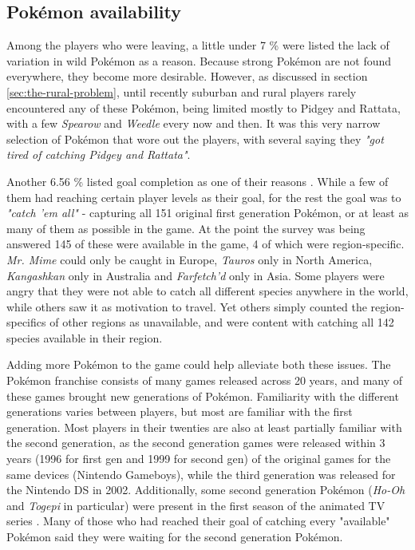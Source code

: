 \subsection{Pokémon availability}
\label{sec:pokemon-availability-and-goal-completion}
Among the players who were leaving, a little under 7 \% were listed the lack of variation in wild Pokémon as a reason. Because strong Pokémon are not found everywhere, they become more desirable. However, as discussed in section \ref{sec:the-rural-problem}, until recently suburban and rural players rarely encountered any of these Pokémon, being limited mostly to Pidgey and Rattata, with a few \emph{Spearow} and \emph{Weedle} every now and then. It was this very narrow selection of Pokémon that wore out the players, with several saying they \emph{"got tired of catching Pidgey and Rattata"}.

Another 6.56 \% listed goal completion as one of their reasons . While a few of them had reaching certain player levels as their goal, for the rest the goal was to \emph{"catch 'em all"} - capturing all 151 original first generation Pokémon, or at least as many of them as possible in the game. At the point the survey was being answered 145 of these were available in the game, 4 of which were region-specific. \emph{Mr. Mime} could only be caught in Europe, \emph{Tauros} only in North America, \emph{Kangashkan} only in Australia and \emph{Farfetch'd} only in Asia. Some players were angry that they were not able to catch all different species anywhere in the world, while others saw it as motivation to travel. Yet others simply counted the region-specifics of other regions as unavailable, and were content with catching all 142 species available in their region.

Adding more Pokémon to the game could help alleviate both these issues. The Pokémon franchise consists of many games released across 20 years, and many of these games brought new generations of Pokémon. Familiarity with the different generations varies between players, but most are familiar with the first generation. Most players in their twenties are also at least partially familiar with the second generation, as the second generation games were released within 3 years (1996 for first gen and 1999 for second gen) of the original games for the same devices (Nintendo Gameboys), while the third generation was released for the Nintendo DS in 2002. Additionally, some second generation Pokémon (\emph{Ho-Oh} and \emph{Togepi} in particular) were present in the first season of the animated TV series . Many of those who had reached their goal of catching every "available" Pokémon said they were waiting for the second generation Pokémon.

